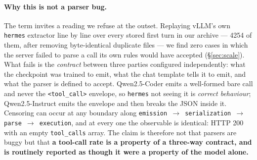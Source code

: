 \paragraph{Why this is not a parser bug.}
The term invites a reading we refuse at the outset. Replaying vLLM's own \texttt{hermes} extractor
line by line over every stored first turn in our archive --- 4254 of them, after removing
byte-identical duplicate files --- we find zero cases in which the server failed to parse a call
its own rules would have accepted (\S\ref{sec:scale}). What fails is the \emph{contract} between
three parties configured independently: what the checkpoint was trained to emit, what the chat
template tells it to emit, and what the parser is defined to accept. Qwen2.5-Coder emits a
well-formed bare call and never the \texttt{<tool\_call>} envelope, so \texttt{hermes} not seeing
it is \emph{correct behaviour}; Qwen2.5-Instruct emits the envelope and then breaks the JSON
inside it. Censoring can occur at any boundary along
\texttt{emission $\to$ serialization $\to$ parse $\to$ execution}, and at every one the observable
is identical: HTTP 200 with an empty \texttt{tool\_calls} array. The claim is therefore not that
parsers are buggy but that \textbf{a tool-call rate is a property of a three-way contract, and is
routinely reported as though it were a property of the model alone.}

